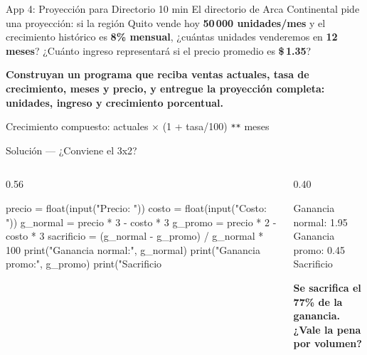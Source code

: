 \documentclass[aspectratio=169, 11pt]{beamer}
\begin{document}
\begin{frame}[fragile]{App 4: Proyección para Directorio \hfill {\normalsize\color{arcaRed}\faClock\hspace{4pt}10 min}}
  \vspace{-6pt}
  {\small\color{arcaDark}
    El directorio de Arca Continental pide una proyección:
    si la región Quito vende hoy \textbf{50\,000 unidades/mes}
    y el crecimiento histórico es \textbf{8\% mensual},
    ¿cuántas unidades venderemos en \textbf{12 meses}?
    ¿Cuánto ingreso representará si el precio promedio es
    \textbf{\$\,1.35}?}

  \vspace{6pt}
  {\small\color{arcaDark}\bfseries
    Construyan un programa que reciba ventas actuales, tasa
    de crecimiento, meses y precio, y entregue la proyección
    completa: unidades, ingreso y crecimiento porcentual.}

  \vspace{6pt}
  {\scriptsize\color{textMuted}
    \faLightbulb[regular]\hspace{4pt}%
    Crecimiento compuesto: actuales $\times$ (1 + tasa/100)
    \texttt{**} meses}
\end{frame}

\begin{frame}[fragile,shrink=5]{Solución --- ¿Conviene el 3x2?}
  \vspace{-6pt}
  \begin{columns}[T]
    \begin{column}{0.56\textwidth}
      \begin{pyblock}
precio = float(input("Precio: "))
costo = float(input("Costo: "))
g_normal = precio * 3 - costo * 3
g_promo = precio * 2 - costo * 3
sacrificio = (g_normal - g_promo) / g_normal * 100
print("Ganancia normal:", g_normal)
print("Ganancia promo:", g_promo)
print("Sacrificio %
      \end{pyblock}
    \end{column}

    \begin{column}{0.40\textwidth}
      \begin{outputblock}
Ganancia normal: 1.95
Ganancia promo: 0.45
Sacrificio %
      \end{outputblock}

      \vspace{4pt}
      {\scriptsize\color{arcaRed}\bfseries
        Se sacrifica el 77\% de la ganancia.
        ¿Vale la pena por volumen?}
    \end{column}
  \end{columns}
\end{frame}
\end{document}
